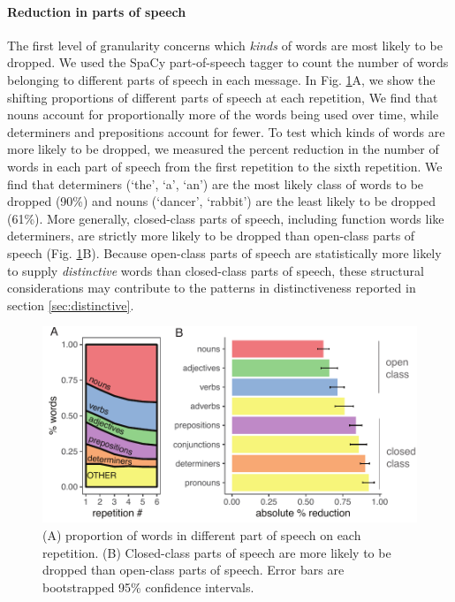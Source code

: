\documentclass[alpha-refs]{wiley-article}
\begin{document}
\paragraph{Reduction in parts of speech}


The first level of granularity concerns which \emph{kinds} of words are most likely to be dropped. 
We used the SpaCy part-of-speech tagger \citep{spacy2} to count the number of words belonging to different parts of speech in each message.
In Fig. \ref{fig:pos}A, we show the shifting proportions of different parts of speech at each repetition, 
We find that nouns account for proportionally more of the words being used over time, while determiners and prepositions account for fewer.
To test which kinds of words are more likely to be dropped, we measured the percent reduction in the number of words in each part of speech from the first repetition to the sixth repetition. 
We find that determiners (`the', `a', `an') are the most likely class of words to be dropped (90\%) and nouns (`dancer', `rabbit') are the least likely to be dropped (61\%).%
More generally, closed-class parts of speech, including function words like determiners, are strictly more likely to be dropped than open-class parts of speech (Fig. \ref{fig:pos}B).
Because open-class parts of speech are statistically more likely to supply \emph{distinctive} words than closed-class parts of speech, these structural considerations may contribute to the patterns in distinctiveness reported in section \ref{sec:distinctive}.


\begin{figure}[t!]
\centering
\includegraphics[scale=.8]{posResults.pdf}
\caption{(A) proportion of words in different part of speech on each repetition. (B) Closed-class parts of speech are more likely to be dropped than open-class parts of speech. Error bars are bootstrapped 95\% confidence intervals.} 
\label{fig:pos}
\end{figure}
\end{document}
